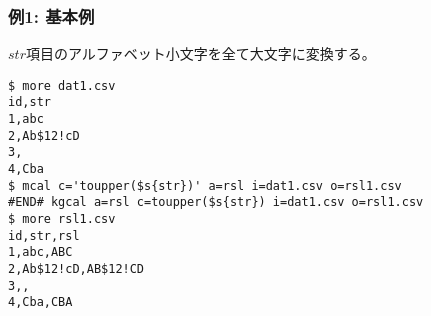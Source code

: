 \subsubsection*{例1: 基本例}

$str$項目のアルファベット小文字を全て大文字に変換する。


\begin{Verbatim}[baselinestretch=0.7,frame=single]
$ more dat1.csv
id,str
1,abc
2,Ab$12!cD
3,
4,Cba
$ mcal c='toupper($s{str})' a=rsl i=dat1.csv o=rsl1.csv
#END# kgcal a=rsl c=toupper($s{str}) i=dat1.csv o=rsl1.csv
$ more rsl1.csv
id,str,rsl
1,abc,ABC
2,Ab$12!cD,AB$12!CD
3,,
4,Cba,CBA
\end{Verbatim}
